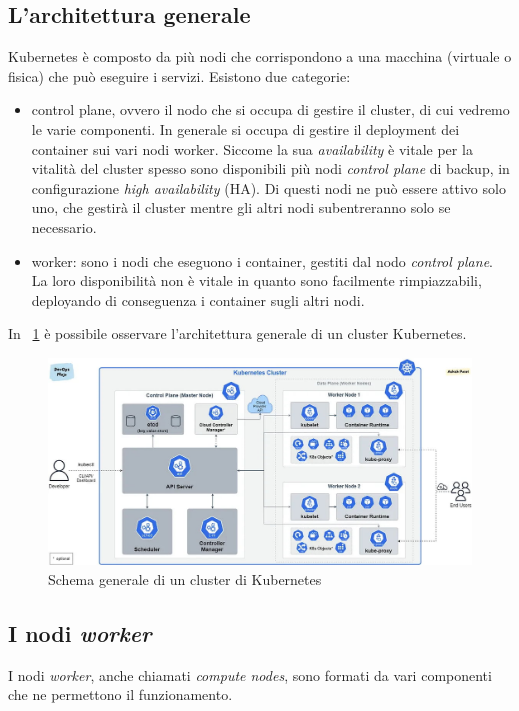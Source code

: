 \documentclass[12pt, hidelinks]{report}
\begin{document}
\subsection{L'architettura generale}
Kubernetes è composto da più nodi che corrispondono a una macchina (virtuale o fisica) che può eseguire i servizi. 
Esistono due categorie:
\begin{itemize}
    \item control plane, ovvero il nodo che si occupa di gestire il cluster, di cui vedremo le varie componenti. In generale si occupa di gestire il deployment dei container sui vari nodi worker. Siccome la sua \textit{availability} è vitale per la vitalità del cluster spesso sono disponibili più nodi \textit{control plane} di backup, in configurazione \textit{high availability} (HA). Di questi nodi ne può essere attivo solo uno, che gestirà il cluster mentre gli altri nodi subentreranno solo se necessario.
    \item worker: sono i nodi che eseguono i container, gestiti dal nodo \textit{control plane}. La loro disponibilità non è vitale in quanto sono facilmente rimpiazzabili, deployando di conseguenza i container sugli altri nodi.
\end{itemize}

In \figurename~\ref{fig:kubernetes-general-architecture} è possibile osservare l'architettura generale di un cluster Kubernetes.

\begin{figure}
    \centering
    \includegraphics[width=\linewidth]{2_kubernetes_general_architecture.jpg}
    \caption{Schema generale di un cluster di Kubernetes \cite{kubernetes_architecture}}
    \label{fig:kubernetes-general-architecture}
\end{figure}

\subsection{I nodi \textit{worker}}
I nodi \textit{worker}, anche chiamati \textit{compute nodes}, sono formati da vari componenti che ne permettono il funzionamento. 
\end{document}
